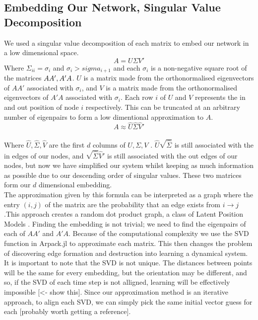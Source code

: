 \documentclass{article}
\begin{document}
    \subsection{Embedding Our Network, Singular Value Decomposition}
    We used a singular value decomposition of each matrix to embed our network in a low dimensional space.\
    \[
    A = U\Sigma V'
    \]
    Where $\Sigma_{ii} = \sigma_i$ and $\sigma_i > sigma_{i+1}$ and each $\sigma_i$ is a non-negative square root of the matrices $AA', \space A'A$. $U$ is a matrix made from the orthonormalised eigenvectors of $AA'$ associated with $\sigma_i$, and $V$ is a matrix made from the orthonormalised eigenvectors of $A'A$ associated with $\sigma_i$. Each row $i$ of $U$ and $V$ represents the in and out position of node $i$ respectively. This can be truncated at an arbitrary number of eigenpairs to form a low dimentional approximation to $A$.
    \[
     A \approx \hat U \hat \Sigma \hat V'
    \]\\
    Where $\hat U, \hat \Sigma, \hat V$ are the first $d$ columns of $U, \Sigma, V$ \cite{golub1971singular}. $\hat U \sqrt{\hat \Sigma}$ is still associated with the in edges of our nodes, and $\sqrt{\hat \Sigma} \hat V' $ is still associated with the out edges of our nodes, but now we have simplified our system whilst keeping as much information as possible due to our descending order of singular values. These two matrices form our $d$ dimensional embedding.\\

    The approximation given by this formula can be interpreted as a graph where the entry $(i,j)$ of the matrix are the probability that an edge exists from $i \rightarrow j$.This approach creates a random dot product graph, a class of Latent Position Models \cite{hoff2002latent}. Finding the embedding is not trivial; we need to find the eigenpairs of each of $AA'$ and $A'A$. Because of the computational complexity we use the SVD function in Arpack.jl to approximate each matrix. This then changes the problem of discovering edge formation and destruction into learning a dynamical system.\\
    It is important to note that the SVD is not unique. The distances between points will be the same for every embedding, but the orientation may be different, and so, if the SVD of each time step is not alligned, learning will be effectively impossible [<- show this]. Since our approximation method is an iterative approach, to align each SVD, we can simply pick the same initial vector guess for each [probably worth getting a reference].  
    
\end{document}
